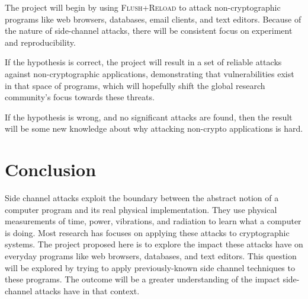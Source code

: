\documentclass{acm_proc_article-sp}
\begin{document}
The project will begin by using \textsc{Flush+Reload} to attack
non-cryptographic programs like web browsers, databases, email clients, and text
editors. Because of the nature of side-channel attacks, there will be consistent
focus on experiment and reproducibility.

If the hypothesis is correct, the project will result in a set of reliable
attacks against non-cryptographic applications, demonstrating that
vulnerabilities exist in that space of programs, which will hopefully shift the
global research community's focus towards these threats.

If the hypothesis is wrong, and no significant attacks are found, then the
result will be some new knowledge about why attacking non-crypto applications is
hard.

\section{Conclusion}

Side channel attacks exploit the boundary between the abstract notion of
a computer program and its real physical implementation. They use physical
measurements of time, power, vibrations, and radiation to learn what a computer
is doing. Most research has focuses on applying these attacks to cryptographic
systems. The project proposed here is to explore the impact these attacks have
on everyday programs like web browsers, databases, and text editors. This
question will be explored by trying to apply previously-known side channel
techniques to these programs. The outcome will be a greater understanding of the
impact side-channel attacks have in that context.



\end{document}
